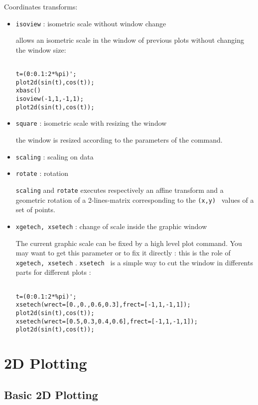 Coordinates transforms:
\begin{itemize}

\item \verb+isoview+	: isometric scale without window change 

allows an isometric scale in the window of previous plots without changing
the window size:

\begin{verbatim}

t=(0:0.1:2*%pi)';
plot2d(sin(t),cos(t));
xbasc()
isoview(-1,1,-1,1);
plot2d(sin(t),cos(t));

\end{verbatim}

\item \verb+square+	: isometric scale with resizing the window

the window is resized according to the parameters of the command.

\item \verb+scaling+	: scaling on data
\item \verb+rotate+	: rotation

\verb+scaling+ and \verb+rotate+ executes respectively an affine transform and
a geometric rotation of a 2-lines-matrix corresponding to the {\tt (x,y) }
values of a set of points.
\item \verb+xgetech, xsetech+	: change of scale inside the graphic window

The current graphic scale can be fixed by a high level plot command. You may
want to get this parameter or to fix it directly : this is the role of 
\verb+xgetech, xsetech+ . {\tt xsetech } is a simple way to cut the
window in differents parts for different plots :

\begin{verbatim}

t=(0:0.1:2*%pi)';
xsetech(wrect=[0.,0.,0.6,0.3],frect=[-1,1,-1,1]);
plot2d(sin(t),cos(t));
xsetech(wrect=[0.5,0.3,0.4,0.6],frect=[-1,1,-1,1]);
plot2d(sin(t),cos(t));

\end{verbatim}

\end{itemize}
%


\section{2D Plotting}

\subsection{Basic 2D Plotting}

